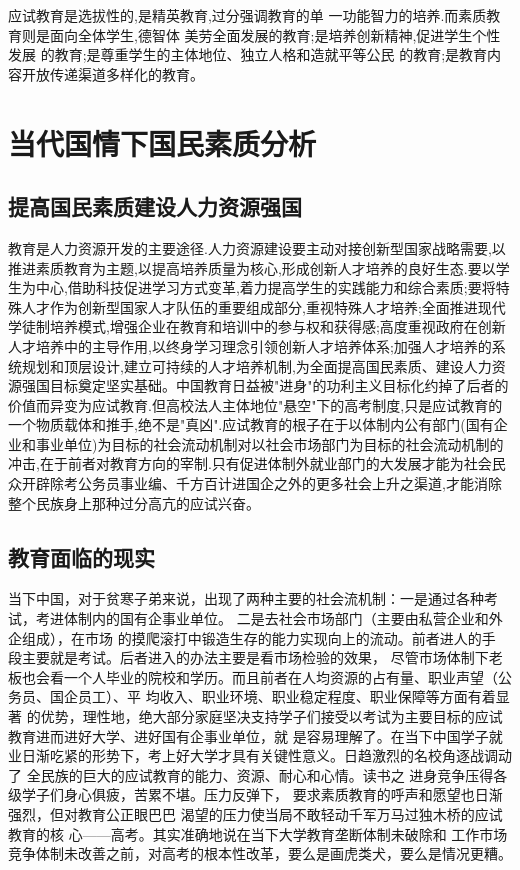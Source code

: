 \documentclass[UTF8]{ctexart}
\begin{document}
	\par{应试教育是选拔性的,是精英教育,过分强调教育的单 一功能智力的培养.而素质教育则是面向全体学生,德智体 美劳全面发展的教育;是培养创新精神,促进学生个性发展 的教育;是尊重学生的主体地位、独立人格和造就平等公民 的教育;是教育内容开放传递渠道多样化的教育。\textsuperscript{\cite{LHL}}}
\section{当代国情下国民素质分析}
	\subsection{提高国民素质建设人力资源强国}
	 教育是人力资源开发的主要途径.人力资源建设要主动对接创新型国家战略需要,以推进素质教育为主题,以提高培养质量为核心,形成创新人才培养的良好生态.要以学生为中心,借助科技促进学习方式变革,着力提高学生的实践能力和综合素质;要将特殊人才作为创新型国家人才队伍的重要组成部分,重视特殊人才培养;全面推进现代学徒制培养模式,增强企业在教育和培训中的参与权和获得感;高度重视政府在创新人才培养中的主导作用,以终身学习理念引领创新人才培养体系;加强人才培养的系统规划和顶层设计,建立可持续的人才培养机制,为全面提高国民素质、建设人力资源强国目标奠定坚实基础。中国教育日益被"进身"的功利主义目标化约掉了后者的价值而异变为应试教育.但高校法人主体地位"悬空"下的高考制度,只是应试教育的一个物质载体和推手,绝不是"真凶".应试教育的根子在于以体制内公有部门(国有企业和事业单位)为目标的社会流动机制对以社会市场部门为目标的社会流动机制的冲击,在于前者对教育方向的宰制.只有促进体制外就业部门的大发展才能为社会民众开辟除考公务员事业编、千方百计进国企之外的更多社会上升之渠道,才能消除整个民族身上那种过分高亢的应试兴奋\textsuperscript{\cite{LGD}}。
	\subsection{教育面临的现实}
	当下中国，对于贫寒子弟来说，出现了两种主要的社会流机制：一是通过各种考试，考进体制内的国有企事业单位。 二是去社会市场部门（主要由私营企业和外企组成），在市场 的摸爬滚打中锻造生存的能力实现向上的流动。前者进人的手 段主要就是考试。后者进入的办法主要是看市场检验的效果， 尽管市场体制下老板也会看一个人毕业的院校和学历。而且前者在人均资源的占有量、职业声望（公务员、国企员工）、平 均收入、职业环境、职业稳定程度、职业保障等方面有着显著 的优势，理性地，绝大部分家庭坚决支持学子们接受以考试为主要目标的应试教育进而进好大学、进好国有企事业单位，就 是容易理解了。在当下中国学子就业日渐吃紧的形势下，考上好大学才具有关键性意义。日趋激烈的名校角逐战调动了 全民族的巨大的应试教育的能力、资源、耐心和心情。读书之 进身竞争压得各级学子们身心俱疲，苦累不堪。压力反弹下， 要求素质教育的呼声和愿望也日渐强烈，但对教育公正眼巴巴 渴望的压力使当局不敢轻动千军万马过独木桥的应试教育的核 心——高考。其实准确地说在当下大学教育垄断体制未破除和 工作市场竞争体制未改善之前，对高考的根本性改革，要么是画虎类犬，要么是情况更糟。
\end{document}
